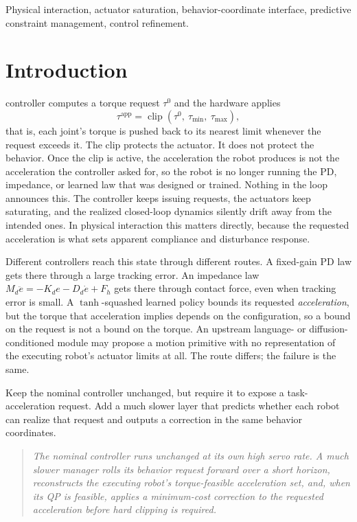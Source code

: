 \documentclass[journal]{IEEEtran}
\begin{document}
\begin{IEEEkeywords}
Physical interaction, actuator saturation, behavior-coordinate interface, predictive constraint management, control refinement.
\end{IEEEkeywords}

\section{Introduction}
\label{sec:intro}

 controller computes a torque request $\tau^0$ and the hardware applies
\[
\tau^{\mathrm{app}}
=
\operatorname{clip}\left(\tau^0,\ \tau_{\min},\ \tau_{\max}\right),
\]
that is, each joint's torque is pushed back to its nearest limit whenever the request exceeds it. The clip protects the actuator. It does not protect the behavior. Once the clip is active, the acceleration the robot produces is not the acceleration the controller asked for, so the robot is no longer running the PD, impedance, or learned law that was designed or trained. Nothing in the loop announces this. The controller keeps issuing requests, the actuators keep saturating, and the realized closed-loop dynamics silently drift away from the intended ones. In physical interaction this matters directly, because the requested acceleration is what sets apparent compliance and disturbance response.

Different controllers reach this state through different routes. A fixed-gain PD law gets there through a large tracking error. An impedance law $M_d\ddot e=-K_de-D_d\dot e+F_h$ gets there through contact force, even when tracking error is small. A $\tanh$-squashed learned policy bounds its requested \emph{acceleration}, but the torque that acceleration implies depends on the configuration, so a bound on the request is not a bound on the torque. An upstream language- or diffusion-conditioned module may propose a motion primitive with no representation of the executing robot's actuator limits at all. The route differs; the failure is the same.

Keep the nominal controller unchanged, but require it to expose a task-acceleration request. Add a much slower layer that predicts whether each robot can realize that request and outputs a correction in the same behavior coordinates.

\begin{quote}
\emph{The nominal controller runs unchanged at its own high servo rate. A much slower manager rolls its behavior request forward over a short horizon, reconstructs the executing robot's torque-feasible acceleration set, and, when its QP is feasible, applies a minimum-cost correction to the requested acceleration before hard clipping is required.}
\end{quote}
\end{document}
